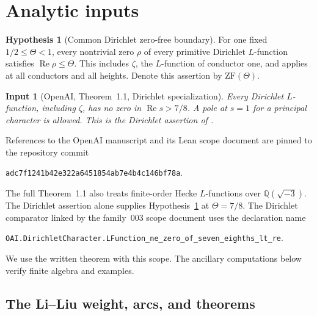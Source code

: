 \documentclass[11pt]{article}
\newtheorem{inputthm}[theorem]{Input}
\theoremstyle{definition}
\newtheorem{hypothesis}[theorem]{Hypothesis}
\theoremstyle{remark}
\numberwithin{equation}{section}
\DeclareMathOperator{\Rea}{Re}
\begin{document}
\section{Analytic inputs}\label{sec:inputs}

\begin{hypothesis}[Common Dirichlet zero-free boundary]\label{hyp:ZF}
For one fixed $1/2\le\Theta<1$, every nontrivial zero $\rho$ of every
primitive Dirichlet $L$-function satisfies $\Rea\rho\le\Theta$.
This includes $\zeta$, the $L$-function of conductor one, and applies
at all conductors and all heights. Denote this assertion by
$\mathrm{ZF}(\Theta)$.
\end{hypothesis}

\begin{inputthm}[OpenAI, Theorem~1.1, Dirichlet specialization]\label{input:openai}
Every Dirichlet $L$-function, including $\zeta$, has no zero in
$\Rea s>7/8$. A pole at $s=1$ for a principal character is allowed.
This is the Dirichlet assertion of \cite[Theorem~1.1]{OpenAIQ78}.
\end{inputthm}

References to the OpenAI manuscript and its Lean scope document
\cite{OpenAIQ78,OpenAIScope} are pinned to the repository commit
\begin{center}\small
\nolinkurl{adc7f1241b42e322a6451854ab7e4b4c146bf78a}.
\end{center}
The full Theorem~1.1 also treats finite-order Hecke $L$-functions over
$\mathbb Q(\sqrt{-3})$. The Dirichlet assertion alone supplies
Hypothesis~\ref{hyp:ZF} at $\Theta=7/8$. The Dirichlet comparator
linked by the family~003 scope document uses the declaration name
\begin{center}\small
\nolinkurl{OAI.DirichletCharacter.LFunction_ne_zero_of_seven_eighths_lt_re}.
\end{center}
We use the written theorem with this scope. The ancillary computations
below verify finite algebra and examples.

\subsection{The Li--Liu weight, arcs, and theorems}
\end{document}
